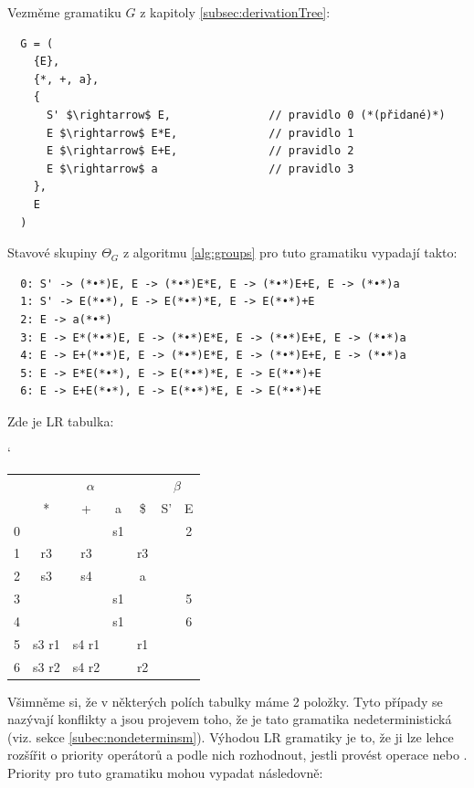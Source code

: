 \begin{exmp} Vezměme gramatiku $G$ z kapitoly \ref{subsec:derivationTree}:


\begin{lstlisting}
  G = (
    {E},
    {*, +, a},
    {
      S' $\rightarrow$ E,               // pravidlo 0 (*(přidané)*)
      E $\rightarrow$ E*E,              // pravidlo 1
      E $\rightarrow$ E+E,              // pravidlo 2
      E $\rightarrow$ a                 // pravidlo 3
    },
    E
  )
\end{lstlisting}

\noindent
Stavové skupiny $\Theta_G$ z algoritmu \ref{alg:groups} pro tuto gramatiku vypadají takto:
\begin{lstlisting}
  0: S' -> (*•*)E, E -> (*•*)E*E, E -> (*•*)E+E, E -> (*•*)a
  1: S' -> E(*•*), E -> E(*•*)*E, E -> E(*•*)+E
  2: E -> a(*•*)
  3: E -> E*(*•*)E, E -> (*•*)E*E, E -> (*•*)E+E, E -> (*•*)a
  4: E -> E+(*•*)E, E -> (*•*)E*E, E -> (*•*)E+E, E -> (*•*)a
  5: E -> E*E(*•*), E -> E(*•*)*E, E -> E(*•*)+E
  6: E -> E+E(*•*), E -> E(*•*)*E, E -> E(*•*)+E
\end{lstlisting}

\noindent
Zde je LR tabulka:

\begin{table}[H]
  \catcode`
  \centering
  \begin{tabular}{| c || c | c | c | c || c | c |}
    \hline
    \multirow{2}{*}{} & \multicolumn{4}{c||}{$\alpha$}& \multicolumn{2}{c|}{$\beta$} \\
    \cline{2-7}
      & * & + & a & \$& S'& E \\
    \hhline{|=||=|=|=|=||=|=|}
    0 &   &   & s1 &   &   & 2 \\
    \hline
    1 & r3 & r3 &   & r3 &   &   \\
    \hline
    2 & s3 & s4 &   & a &   &   \\
    \hline
    3 &   &   & s1 &   &   & 5 \\
    \hline
    4 &   &   & s1 &   &   & 6 \\
    \hline
    5 & s3 r1 &  s4 r1 & & r1 &   & \\
    \hline
    6 & s3 r2 &  s4 r2 & & r2 &   & \\
    \hline
  \end{tabular}
\end{table}

Všimněme si, že v některých polích tabulky máme 2 položky. Tyto případy
se nazývají  konflikty a jsou projevem toho, že je tato
gramatika nedeterministická (viz. sekce \ref{subec:nondeterminsm}).
Výhodou LR gramatiky je to, že ji lze lehce rozšířit o priority operátorů
a podle nich rozhodnout, jestli provést operace  nebo .
Priority pro tuto gramatiku mohou vypadat následovně:


\end{exmp}
